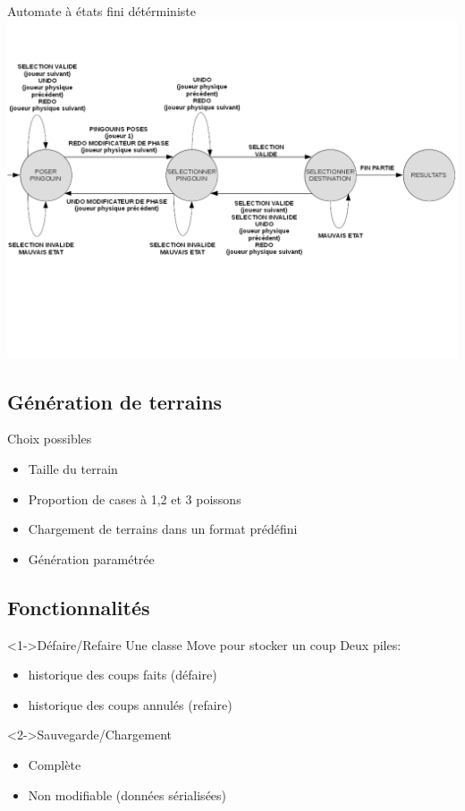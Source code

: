 \documentclass{beamer}
\begin{document}
\begin{frame}{Automate à états fini détérministe}
\includegraphics[scale=0.4]{AFD}
\end{frame}

\subsection{Génération de terrains}

\begin{frame}{}
\begin{block}{Choix possibles}
\begin{itemize}
\item<1-> Taille du terrain
\item<2-> Proportion de cases à 1,2 et 3 poissons
\item<3-> Chargement de terrains dans un format prédéfini
\item<4-> Génération paramétrée
\end{itemize}
\end{block}
\end{frame}

\subsection{Fonctionnalités}
\begin{frame}{}
\begin{block}<1->{Défaire/Refaire} %
Une classe Move pour stocker un coup \newline
Deux piles: 
\begin{itemize}
 \item historique des coups faits (défaire)
 \item historique des coups annulés (refaire)
\end{itemize}
\end{block}
\begin{block}<2->{Sauvegarde/Chargement}
\begin{itemize}
\item Complète
\item Non modifiable (données sérialisées)
\end{itemize}
\end{block}
\end{frame}
\end{document}
